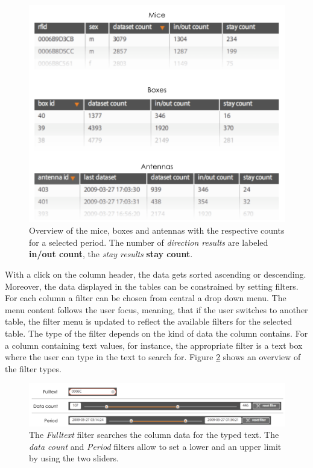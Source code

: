 \begin{figure}[htpb]
\begin{center}
  \includegraphics[width=.75\textwidth]{assets/pdf/overview_list.pdf}
  \caption[Overview of the summarized data for mice, boxes and antennas within a date period]{Overview of the mice, boxes and antennas with the respective counts for a selected period. The number of \textit{direction results} are labeled \textbf{in/out count}, the \textit{stay results}  \textbf{stay count}.}
  \label{fig:data_overview_with_count}
\end{center}
\end{figure}

With a click on the column header, the data gets sorted ascending or descending. Moreover, the data displayed in the tables can be constrained by setting filters. For each column a filter can be chosen from central a drop down menu. The menu content follows the user focus, meaning, that if the user switches to another table, the filter menu is updated to reflect the available filters for the selected table. The type of the filter depends on the kind of data the column contains. For a column containing text values, for instance, the appropriate filter is a text box where the user can type in the text to search for. Figure \ref{fig:filter_types} shows an overview of the filter types.

\begin{figure}[htpb]
\begin{center}
  \includegraphics[width=\textwidth]{assets/pdf/filter_types.pdf}
  \caption[Filter types]{The \textit{Fulltext} filter searches the column data for the typed text. The \textit{data count} and \textit{Period} filters allow to set a lower and an upper limit by using the two sliders.}
  \label{fig:filter_types}
\end{center}
\end{figure}

